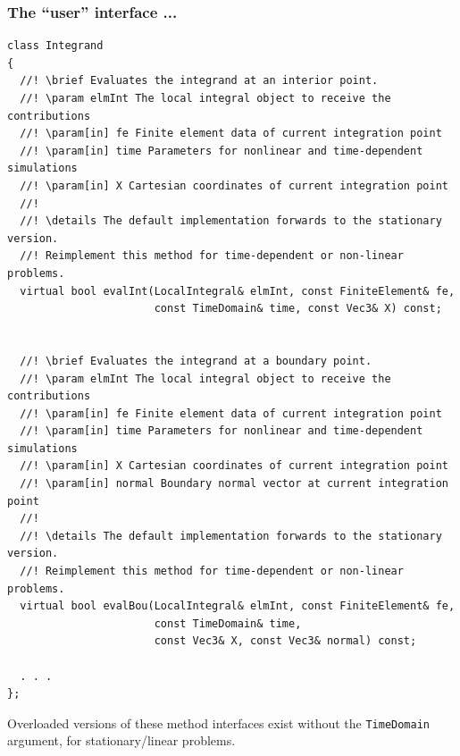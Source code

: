 \documentclass{beamer}
\begin{document}
\begin{frame}[fragile] %

 \frametitle{The ``user'' interface ...}

 \tiny
 \begin{verbatim}
class Integrand
{
  //! \brief Evaluates the integrand at an interior point.
  //! \param elmInt The local integral object to receive the contributions
  //! \param[in] fe Finite element data of current integration point
  //! \param[in] time Parameters for nonlinear and time-dependent simulations
  //! \param[in] X Cartesian coordinates of current integration point
  //!
  //! \details The default implementation forwards to the stationary version.
  //! Reimplement this method for time-dependent or non-linear problems.
  virtual bool evalInt(LocalIntegral& elmInt, const FiniteElement& fe,
                       const TimeDomain& time, const Vec3& X) const;


  //! \brief Evaluates the integrand at a boundary point.
  //! \param elmInt The local integral object to receive the contributions
  //! \param[in] fe Finite element data of current integration point
  //! \param[in] time Parameters for nonlinear and time-dependent simulations
  //! \param[in] X Cartesian coordinates of current integration point
  //! \param[in] normal Boundary normal vector at current integration point
  //!
  //! \details The default implementation forwards to the stationary version.
  //! Reimplement this method for time-dependent or non-linear problems.
  virtual bool evalBou(LocalIntegral& elmInt, const FiniteElement& fe,
                       const TimeDomain& time,
                       const Vec3& X, const Vec3& normal) const;

  . . .
};
 \end{verbatim}
 \vskip-5mm\footnotesize
 Overloaded versions of these method interfaces exist without the
 {\tt TimeDomain} argument, for stationary/linear problems.
\end{frame}
\end{document}
